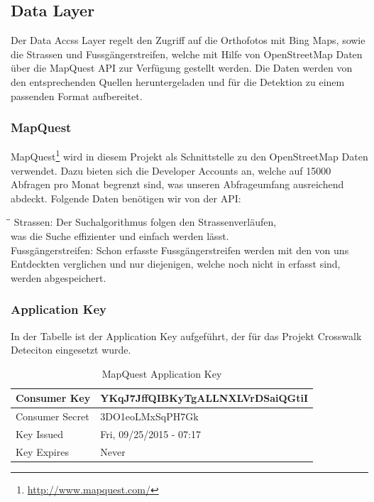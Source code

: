 \subsection{Data Layer}
Der Data Accss Layer regelt den Zugriff auf die Orthofotos mit Bing Maps, sowie die Strassen und Fussgängerstreifen, welche mit Hilfe von OpenStreetMap Daten über die MapQuest API zur Verfügung gestellt werden. Die Daten werden von den entsprechenden Quellen heruntergeladen und für die Detektion zu einem passenden Format aufbereitet.

\subsubsection{MapQuest}
\Gls{MapQuest}\footnote{\url{http://www.mapquest.com/}} wird in diesem Projekt als Schnittstelle zu den OpenStreetMap Daten verwendet. Dazu bieten sich die Developer Accounts an, welche auf 15000 Abfragen pro Monat begrenzt sind, was unseren Abfrageumfang ausreichend abdeckt.
Folgende Daten benötigen wir von der API:
\begin{tabbing}[H]
    \hspace*{3cm}\=\hspace*{9cm}\= \kill
    Strassen: \> Der Suchalgorithmus folgen den Strassenverläufen, \\
     			\> was die Suche effizienter und einfach werden lässt.\\
    Fussgängerstreifen: \> Schon erfasste Fussgängerstreifen werden mit den von uns  \\ \> Entdeckten verglichen und nur diejenigen, welche noch nicht in erfasst sind,\\ \> werden abgespeichert.
\end{tabbing}


\subsubsection{Application Key}
In der Tabelle ist der Application Key aufgeführt, der für das Projekt Crosswalk Deteciton eingesetzt wurde.
\begin{table}[H]
	\begin{tabular}{ | p{6cm} | p{6cm}  | }
		\hline    
		Consumer Key &  YKqJ7JffQIBKyTgALLNXLVrDSaiQGtiI \\ \hline
		Consumer Secret & 3DO1eoLMxSqPH7Gk \\ \hline
		Key Issued & Fri, 09/25/2015 - 07:17 \\ \hline
		Key Expires & Never \\ \hline
	\end{tabular}
	\caption[MapQuest Application Key]{MapQuest Application Key}
\end{table}

